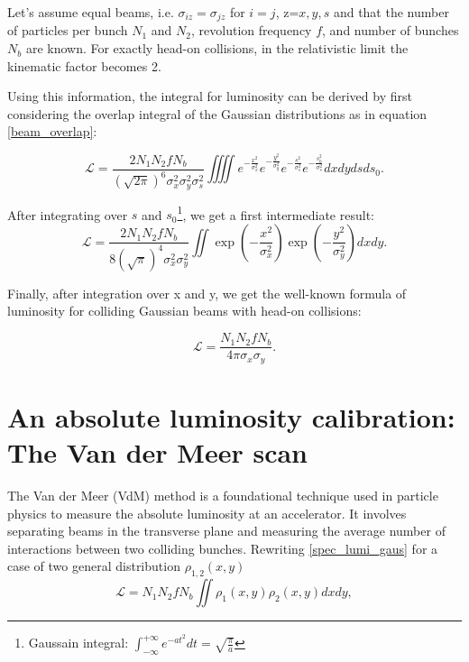 Let's assume equal beams, i.e.  $\sigma_{iz} = \sigma_{jz}$ for $i=j$, z=$x,y,s$ and that the number of particles per bunch $N_1$ and $N_2$, revolution frequency $f$, and number of bunches $N_b$ are known. For exactly head-on collisions, in the relativistic limit the kinematic factor becomes 2.

Using this information, the integral for luminosity can be derived by first considering the overlap integral of the Gaussian distributions as in equation \eqref{beam_overlap}:

\begin{equation}
\mathcal{L} = \frac{2  N_1 N_2 f N_b}{(\sqrt{2\pi})^6 \sigma_x^2\sigma_y^2\sigma_s^2}\iiiint e^{-\frac{x^2}{ \sigma_x^2}} e^{-\frac{y^2}{\sigma_y^2}} e^{-\frac{s^2}{\sigma_s^2}}e^{-\frac{s_0^2}{\sigma_s^2}}dxdydsds_0.
\end{equation}

After integrating over $s$ and $s_0$\footnote{Gaussain integral: $\int_{-\infty}^{+\infty}e^{-at^2}dt = \sqrt{\tfrac{\pi}{a}}$}, we get a first intermediate result:
\begin{equation}
    \mathcal{L} = \frac{2  N_1 N_2 f N_b}{8(\sqrt{\pi})^4 \sigma_x^2\sigma_y^2}\iint \exp\left(-\frac{x^2}{\sigma_x^2}\right) \exp\left(-\frac{y^2}{\sigma_y^2}\right) dxdy .\label{spec_lumi_gaus}
\end{equation}

Finally, after integration over x and y, we get the well-known formula of luminosity for colliding Gaussian beams with head-on collisions:

\begin{equation}
\mathcal{L} = \frac{N_1  N_2  f N_b}{4 \pi  \sigma_x \sigma_y}.
\end{equation}




\section{An absolute luminosity calibration: The Van der Meer scan}
The Van der Meer (VdM) method is a foundational technique used in particle physics to measure the absolute luminosity at an accelerator. It involves separating beams in the transverse plane and measuring the average number of interactions between two colliding bunches. 
Rewriting \ref{spec_lumi_gaus} for a case of two general distribution $\rho_{1,2} (x,y)$
\begin{equation}
    \mathcal{L} = N_1 N_2 f N_b\iint \rho_1(x,y) \rho_2(x,y) dxdy,\label{generic_lumi}
\end{equation}

